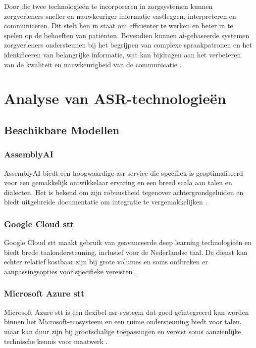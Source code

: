 Door die twee technologieën te incorporeren in zorgsystemen kunnen zorgverleners sneller en nauwkeuriger informatie vastleggen, interpreteren en communiceren. Dit stelt hen in staat om efficiënter te werken en beter in te spelen op de behoeften van patiënten. Bovendien kunnen \gls{ai}-gebaseerde systemen zorgverleners ondersteunen bij het begrijpen van complexe spraakpatronen en het identificeren van belangrijke informatie, wat kan bijdragen aan het verbeteren van de kwaliteit en nauwkeurigheid van de communicatie \autocite{patel2019}. 
\section{Analyse van ASR-technologieën}

\subsection{Beschikbare Modellen}

\subsubsection{AssemblyAI}
AssemblyAI biedt een hoogwaardige \gls{asr}-service die specifiek is geoptimaliseerd voor een gemakkelijk ontwikkelaar ervaring en een breed scala aan talen en dialecten. 
Het is bekend om zijn robuustheid tegenover achtergrondgeluiden en biedt uitgebreide documentatie om integratie te vergemakkelijken \autocite{assemblyai2024}.

\subsubsection{Google Cloud \gls{stt} }
Google Cloud \gls{stt} maakt gebruik van geavanceerde deep learning technologieën en biedt brede taalondersteuning, inclusief voor de Nederlandse taal. De dienst kan echter relatief kostbaar zijn bij grote volumes en soms ontbreken er aanpassingsopties voor specifieke vereisten \autocite{googleasr2024}.

\subsubsection{Microsoft Azure \gls{stt}}
Microsoft Azure \gls{stt} is een flexibel \gls{asr}-systeem dat goed geïntegreerd kan worden binnen het Microsoft-ecosysteem en een ruime ondersteuning biedt voor talen, maar kan duur zijn bij grootschalige toepassingen en vereist soms aanzienlijke technische kennis voor maatwerk \autocite{azurespeech2024}.

